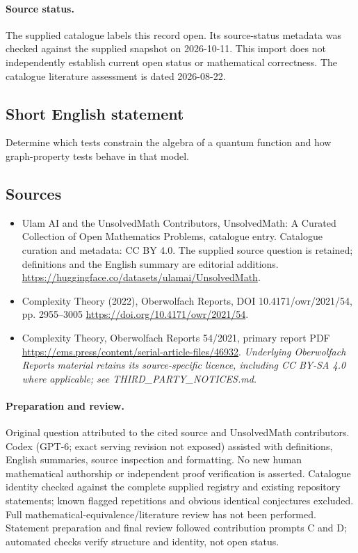 \documentclass[11pt]{article}
\begin{document}
\paragraph{Source status.}
The supplied catalogue labels this record open. Its source-status metadata was checked against the supplied snapshot on 2026-10-11. This import does not independently establish current open status or mathematical correctness. The catalogue literature assessment is dated 2026-08-22.
\subsection{Short English statement}
Determine which tests constrain the algebra of a quantum function and how graph-property tests behave in that model.
\subsection{Sources}
\begin{itemize}
\item[\hypertarget{source:statement:1}{S1}] Ulam AI and the UnsolvedMath Contributors, UnsolvedMath: A Curated Collection of Open Mathematics Problems, catalogue entry. Catalogue curation and metadata: CC BY 4.0. The supplied source question is retained; definitions and the English summary are editorial additions.
\url{https://huggingface.co/datasets/ulamai/UnsolvedMath}.
\item[\hypertarget{source:statement:2}{S2}] Complexity Theory (2022), Oberwolfach Reports, DOI 10.4171/owr/2021/54, pp. 2955--3005
\url{https://doi.org/10.4171/owr/2021/54}.
\item[\hypertarget{source:statement:3}{S3}] Complexity Theory, Oberwolfach Reports 54/2021, primary report PDF
\url{https://ems.press/content/serial-article-files/46932}.
\textit{Underlying Oberwolfach Reports material retains its source-specific licence, including CC BY-SA 4.0 where applicable; see THIRD\_PARTY\_NOTICES.md.}
\end{itemize}
\paragraph{Preparation and review.}
Original question attributed to the cited source and UnsolvedMath contributors. Codex (GPT-6; exact serving revision not exposed) assisted with definitions, English summaries, source inspection and formatting. No new human mathematical authorship or independent proof verification is asserted. Catalogue identity checked against the complete supplied registry and existing repository statements; known flagged repetitions and obvious identical conjectures excluded. Full mathematical-equivalence/literature review has not been performed. Statement preparation and final review followed contribution prompts C and D; automated checks verify structure and identity, not open status.
\label{end:statement}
\end{document}

